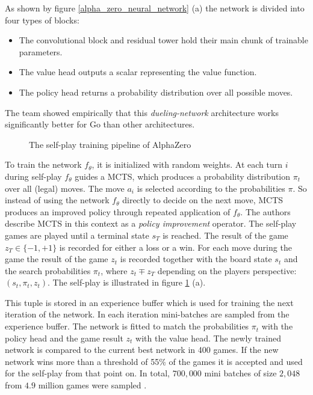 As shown by figure \ref{alpha_zero_neural_network} (a) the network is divided into four types of blocks:

\begin{itemize}
    \item The convolutional block and residual tower hold their main chunk of trainable parameters.
    \item The value head outputs a scalar representing the value function.
    \item The policy head returns a probability distribution over all possible moves.
\end{itemize}

The team showed empirically \cite[p. 9]{silver_mastering_2017} that this \textit{dueling-network} \cite{wang_dueling_2016} architecture works significantly better for Go than other architectures.

\begin{figure}[!h]
    \centering
    \caption{The self-play training pipeline of AlphaZero \cite[p. 5]{silver_mastering_2017}}
    \label{alpha_zero_training}
\end{figure}

To train the network $f_{\theta}$, it is initialized with random weights. At each turn $i$ during self-play $f_{\theta}$ guides a MCTS, which produces a probability distribution $\pi_t$ over all (legal) moves. The move $a_i$ is selected according to the probabilities $\pi$. So instead of using the network $f_{\theta}$ directly to decide on the next move, MCTS produces an improved policy through repeated application of $f_{\theta}$. The authors describe MCTS in this context as a \textit{policy improvement} operator. The self-play games are played until a terminal state $s_T$ is reached. The result of the game $z_T \in \{-1, +1\}$ is recorded for either a loss or a win. For each move during the game the result of the game $z_t$ is recorded together with the board state $s_t$ and the search probabilities $\pi_t$, where $z_t \mp z_T $ depending on the players perspective: $(s_t, \pi_t, z_t)$. The self-play is illustrated in figure \ref{alpha_zero_training} (a).

This tuple is stored in an experience buffer which is used for training the next iteration of the network. In each iteration mini-batches are sampled  from the experience buffer. The network is fitted to match the probabilities $\pi_t$ with the policy head and the game result $z_t$ with the value head. The newly trained network is compared to the current best network in 400 games. If the new network wins more than a threshold of 55\% of the games it is accepted and used for the self-play from that point on. In total, $700,000$ mini batches of size $2,048$ from $4.9$ million games were sampled \cite[p. 6]{silver_mastering_2017}.

